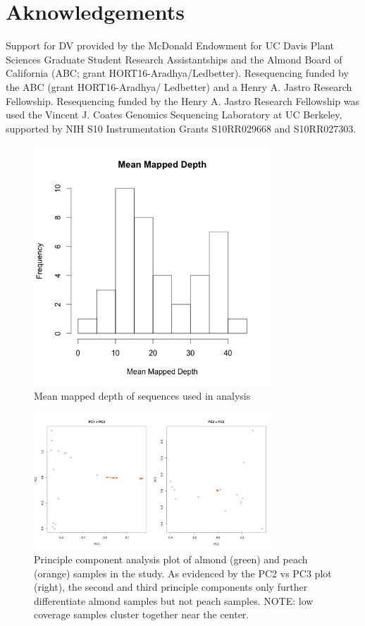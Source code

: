 \documentclass[12pt]{article}
\begin{document}
\section*{Aknowledgements}
Support for DV provided by the McDonald Endowment for UC Davis Plant Sciences Graduate Student Research Assistantships and the Almond Board of California (ABC; grant HORT16-Aradhya/Ledbetter). 
%
Resequencing funded by the ABC (grant HORT16-Aradhya/ Ledbetter) and a Henry A. Jastro Research Fellowship. 
%
Resequencing funded by the Henry A. Jastro Research Fellowship was used the Vincent J. Coates Genomics Sequencing Laboratory at UC Berkeley, supported by NIH S10 Instrumentation Grants S10RR029668 and S10RR027303.
%
\pagebreak

%
%
%
\pagebreak
\begin{figure}[b]
\centering
   \includegraphics[width=0.8\textwidth]{depthBQ20MQ30.png}
  \caption{Mean mapped depth of sequences used in analysis}
  \label{fig:depth}
\end{figure}
%
\pagebreak
\begin{figure}[b]
\centering
   \includegraphics[width=0.8\textwidth]{pca.png}
  \caption{Principle component analysis plot of almond (green) and peach (orange) samples in the study. As evidenced by the PC2 vs PC3 plot (right), the second and third principle components only further differentiate almond samples but not peach samples. NOTE: low coverage samples cluster together near the center.}
  \label{fig:pca}
\end{figure}
\end{document}

